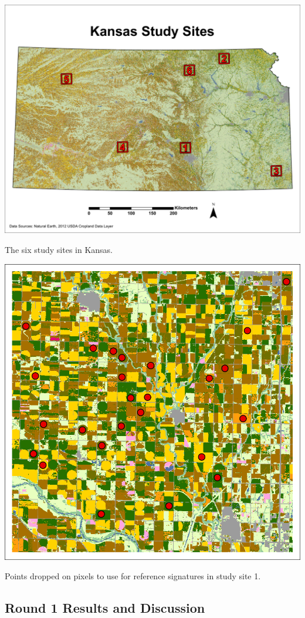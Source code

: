 \begin{ssfigure}
  \centering
  \includegraphics[width=.9\textwidth]{Graphics/Testing/STUDYSITES.pdf}
  \caption{The six study sites in Kansas.}
  \label{fig:studysites}
\end{ssfigure}

\begin{ssfigure}
  \centering
  \includegraphics[width=.7\textwidth]{Graphics/Testing/clip1_30mCDL_smpl_old.pdf}
  \caption{Points dropped on pixels to use for reference signatures in study site 1.}
  \label{fig:refpoints}
\end{ssfigure}

\subsection*{Round 1 Results and Discussion}
\label{appendix:testing:r1:results}

